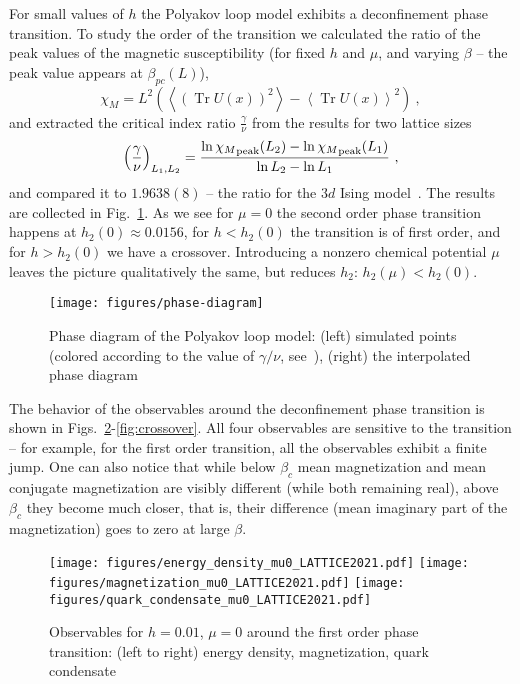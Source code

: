 \documentclass[a4paper,11pt]{article}
\DeclareMathOperator{\TR}{Tr}
\begin{document}
For small values of $h$ the Polyakov loop model exhibits a deconfinement phase transition. To study the order of the transition we calculated the ratio of the peak values of the magnetic susceptibility (for fixed $h$ and $\mu$, and varying $\beta$ -- the peak value appears at $\beta_{pc}(L)$),
\begin{equation}
 \chi_M = L^2 \left(
 \left\langle \left(\TR U(x)\right)^2 \right\rangle - 
 \left\langle \TR U(x) \right\rangle^2 \right) \ ,
\end{equation}
and extracted the critical index ratio $\frac{\gamma}{\nu}$
from the results for two lattice sizes
\begin{equation}
    \left(\frac{\gamma}{\nu}\right)_{L_1, L_2} = 
    \frac{\ln {\chi_M}_{\rm peak}(L_2) - \ln {\chi_M}_{\rm peak}(L_1)}
    {\ln L_2 - \ln L_1} \ ,
\end{equation}
and compared it to $1.9638(8)$ -- the ratio for the $3d$ 
Ising model~\cite{critical-indices}. The results are collected in Fig.~\ref{fig:phase-diagram}. As we see for $\mu = 0$
the second order phase transition happens at $h_2(0) \approx 0.0156$, for $h < h_2(0)$ the transition is of first order, and for $h > h_2(0)$ we have a crossover. Introducing a nonzero chemical potential $\mu$ leaves the picture qualitatively the same, but reduces $h_2$: $h_2(\mu) < h_2(0)$.

\begin{figure}
        \centering
        \texttt{[image: figures/phase-diagram]}
        \caption{Phase diagram of the Polyakov loop model: (left) simulated points (colored according to the value of $\gamma/\nu$, see~\cite{local-observables}), (right) the interpolated phase diagram}
        \label{fig:phase-diagram}
\end{figure}

The behavior of the observables around the deconfinement phase transition is shown in Figs.~\ref{fig:first-order}-\ref{fig:crossover}. 
All four observables are sensitive to the transition -- for example, for the first order transition, all the observables exhibit a finite jump. One can also notice that while below $\beta_c$ mean magnetization and mean conjugate magnetization are visibly different (while both remaining real), above $\beta_c$ they become much closer, that is, their difference (mean imaginary part of the magnetization) 
goes to zero at large $\beta$. 

\begin{figure}
\centering
\texttt{[image: figures/energy\_density\_mu0\_LATTICE2021.pdf]}
\texttt{[image: figures/magnetization\_mu0\_LATTICE2021.pdf]} 
\texttt{[image: figures/quark\_condensate\_mu0\_LATTICE2021.pdf]}
\caption{Observables for $h=0.01$,  $\mu = 0$ around the first order phase transition: (left to right) energy density, magnetization, quark condensate}
\label{fig:first-order}
\end{figure}
\end{document}

